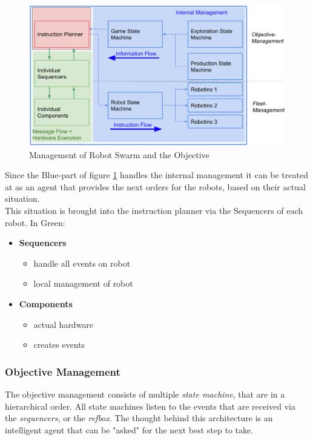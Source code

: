 \begin{figure}[h]
\centering
\includegraphics[scale=0.23]{pic/Instructionplanner2018.png}
\caption{Management of Robot Swarm and the Objective}
\label{fig:instr_overview}
\end{figure}
\newpage

Since the Blue-part of figure \ref{fig:instr_overview} handles the internal management
it can be treated at as an agent that provides the next orders for the robots, based
on their actual situation.\\
This situation is brought into the instruction planner via the Sequencers of each
robot.
In Green: \\
\begin{itemize}
    \item \textbf{Sequencers}
    \begin{itemize}
        \item handle all events on robot
        \item local management of robot
    \end{itemize}
    \item \textbf{Components}
    \begin{itemize}
        \item actual hardware
        \item creates events
    \end{itemize}
\end{itemize}


\subsubsection{Objective Management}
The objective management consists of multiple \textit{state machine}, that are in
a hierarchical order.
All state machines listen to the events that are received via the \textit{sequencers}, or
the \textit{refbox}.
The thought behind this architecture is an intelligent agent that can be "asked" for the next
best step to take.\\

